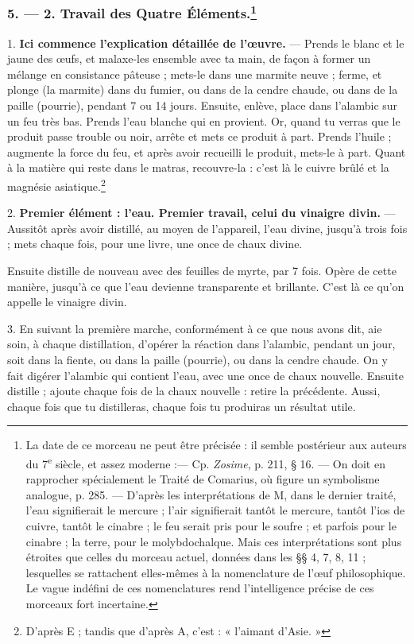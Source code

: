 \documentclass[a4paper, 11pt, oneside, polutonikogreek, french]{article}
\begin{document}
\subsubsection[5. --- 2. Travail des Quatre Éléments.]{5. --- 2. Travail des Quatre Éléments.\footnote{La date de ce morceau ne peut être précisée : il semble postérieur aux auteurs du 7\textsuperscript{e} siècle, et assez moderne :--- Cp. \emph{Zosime}, p. 211, § 16. --- On doit en rapprocher spécialement le Traité de Comarius, où figure un symbolisme analogue, p. 285. --- D'après les interprétations de M, dans le dernier traité, l'eau signifierait le mercure ; l'air signifierait tantôt le mercure, tantôt l'ios de cuivre, tantôt le cinabre ; le feu serait pris pour le soufre ; et parfois pour le cinabre ; la terre, pour le molybdochalque. Mais ces interprétations sont plus étroites que celles du morceau actuel, données dans les §§ 4, 7, 8, 11 ; lesquelles se rattachent elles-mêmes à la nomenclature de l'œuf philosophique. Le vague indéfini de ces nomenclatures rend l'intelligence précise de ces morceaux fort incertaine.}}

1. \textbf{Ici commence l'explication détaillée de l'œuvre.} --- Prends le blanc et le jaune des œufs, et malaxe-les ensemble avec ta main, de façon à former un mélange en consistance pâteuse ; mets-le dans une marmite neuve ; ferme, et plonge (la marmite) dans du fumier, ou dans de la cendre chaude, ou dans de la paille (pourrie), pendant 7 ou 14 jours. Ensuite, enlève, place dans l'alambic sur un feu très bas. Prends l'eau blanche qui en provient. Or, quand tu verras que le produit passe trouble ou noir, arrête et mets ce produit à part. Prends l'huile ; augmente la force du feu, et après avoir recueilli le produit, mets-le à part. Quant à la matière qui reste dans le matras, recouvre-la : c'est là le cuivre brûlé et la magnésie asiatique.\footnote{D'après E ; tandis que d'après A, c'est : « l'aimant d'Asie. »}

2. \textbf{Premier élément : l'eau. Premier travail, celui du vinaigre divin.} --- Aussitôt après avoir distillé, au moyen de l'appareil, l'eau divine, jusqu'à trois fois ; mets chaque fois, pour une livre, une once de chaux divine.

Ensuite distille de nouveau avec des feuilles de myrte, par 7 fois. Opère de cette manière, jusqu'à ce que l'eau devienne transparente et brillante. C'est là ce qu'on appelle le vinaigre divin.

3. En suivant la première marche, conformément à ce que nous avons dit, aie soin, à chaque distillation, d'opérer la réaction dans l'alambic, pendant un jour, soit dans la fiente, ou dans la paille (pourrie), ou dans la cendre chaude. On y fait digérer l'alambic qui contient l'eau, avec une once de chaux nouvelle. Ensuite distille ; ajoute chaque fois de la chaux nouvelle : retire la précédente. Aussi, chaque fois que tu distilleras, chaque fois tu produiras un résultat utile.
\end{document}
